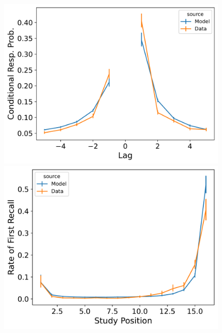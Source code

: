 \documentclass[
  letterpaper,
  11pt,
  english,
  singlespacing,
  headsepline]{MastersDoctoralThesis}
\begin{document}
\begin{figure}

\begin{minipage}{0.33\linewidth}
\includegraphics{icmr_figures/HealyKahana2014_ConnectionistCMR_Model_Fitting_crp-1.png}\end{minipage}%
%
\begin{minipage}{0.33\linewidth}
\includegraphics{icmr_figures/HealyKahana2014_ConnectionistCMR_Model_Fitting_pfr-1.png}\end{minipage}%
%
\begin{minipage}{0.33\linewidth}

\end{minipage}
\end{figure}
\end{document}
